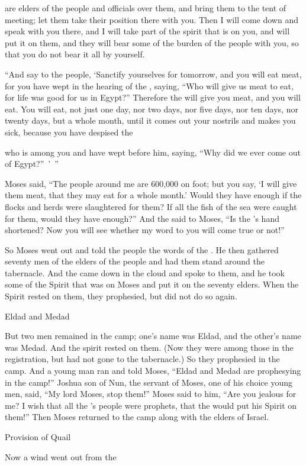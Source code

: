 {are elders
of the people
and officials
over them, and bring
them to
the tent
of meeting;
let them take their position
there
with you.
Then I will come down
and speak
with
you there,
and I will take part
of the spirit
that
is on
you, and will put
it on
them, and they will bear
some of the burden
of the people
with
you, so that you
do not
bear
it all by yourself.
\par }{\PP {}“And say
to
the people,
‘Sanctify
yourselves for tomorrow,
and you will eat
meat,
for
you have wept
in the hearing
of the {}, saying,
“Who
will give us meat
to eat,
for
life was good
for us in Egypt?” Therefore the
{}
will give
you meat,
and you will eat.
You will eat,
not just one
day,
nor two days,
nor five
days,
nor
ten
days,
nor
twenty
days,
but a whole
month,
until
it comes
out
your nostrils
and makes
you sick,
because
you have despised
the

{}
who
is among
you and have wept
before
him, saying,
“Why
did we ever come out
of Egypt?” ’ ”
\par }{\PP {}Moses
said,
“The people
around me are 600,000
on foot;
but you
say,
‘I
will give
them meat,
that they may eat
for a whole
month.’
Would they have enough
if the flocks
and herds
were slaughtered
for them? If
all
the fish
of the sea
were caught
for them, would they have enough?”
And the
{}
said
to
Moses,
“Is the
{}’s
hand
shortened? Now
you will see
whether
my word
to you will come true or
not!”
\par }{\PP {}So Moses
went out
and told
the people
the words
of the {}. He then gathered
seventy
men
of the elders
of the people
and had them stand
around
the tabernacle.
And the
{}
came down
in the cloud
and spoke
to
them, and he took
some
of the Spirit
that
was on
Moses and put
it on
the seventy
elders.
When
the Spirit
rested
on
them, they prophesied,
but did not
do so again.
\par }{\SH Eldad and Medad
\par }{\PP {}But two
men
remained
in the camp;
one’s name
was Eldad,
and the other’s
name
was Medad.
And the spirit
rested
on
them. (Now they
were among those in
the registration,
but had not
gone
to the tabernacle.) So they prophesied
in the camp.
And a young man
ran
and told
Moses,
“Eldad
and Medad
are prophesying
in the camp!”
Joshua
son
of Nun,
the servant
of Moses,
one of his choice young men,
said, “My lord
Moses,
stop them!”
Moses
said
to him, “Are you
jealous
for me? I wish
that all
the
{}’s
people
were prophets,
that
the {}
would put
his Spirit
on them!”
Then Moses
returned
to
the camp
along with the elders
of Israel.
\par }{\SH Provision of Quail
\par }{\PP {}Now a wind
went
out from
the

}
